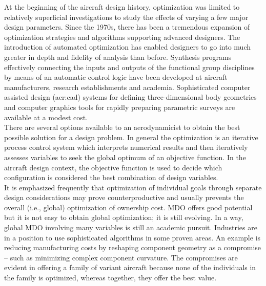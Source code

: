 At the beginning of the aircraft design history, optimization was limited to relatively superficial investigations to study the effects of varying a few major design parameters. 
Since the 1970s, there has been a tremendous expansion of optimization strategies and algorithms supporting advanced designers. The introduction of automated optimization has enabled designers to go into much greater in depth and fidelity of analysis than before. Synthesis programs effectively connecting the inputs and outputs of the functional group disciplines by means of an automatic control logic have been developed at aircraft manufacturers, research establishments and academia. Sophisticated computer assisted design (\gls{acr:cad}) systems for defining three-dimensional body geometries and computer graphics tools for rapidly preparing parametric surveys are available at a modest cost.\\
There are several options available to an aerodynamicist to obtain the best possible solution for a design problem. In general the optimization is an iterative process control system which interprets numerical results and then iteratively assesses variables to seek the global optimum of an objective function. In the aircraft design context, the objective function is used to decide which configuration is considered the best combination of design variables.\cite{torenbeek2013advanced} \\
It is emphasized frequently that optimization of individual goals through separate design considerations may prove counterproductive and usually prevents the overall (i.e., global) optimization of ownership cost.  \gls{MDO} offers good potential but it is not easy to obtain global optimization; it is still evolving. In a way, global  \gls{MDO} involving many variables is still an academic pursuit. Industries are in a position to use sophisticated algorithms in some proven areas. An example is reducing manufacturing costs by reshaping component geometry as a compromise – such as minimizing complex component curvature. The compromises are evident in offering a family of variant aircraft because none of the individuals in the family is optimized, whereas together, they offer the best value.\\

